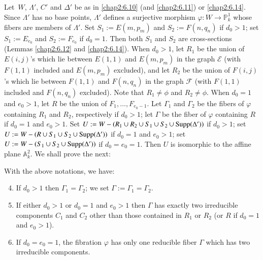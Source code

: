 \subsection{}\label{chap2:6.15}
Let\pageoriginale\ $W$, $\Lambda'$, $C'$ and $\Delta'$ be as in
\ref{chap2:6.10} (and \ref{chap2:6.11}) or \ref{chap2:6.14}. Since $\Lambda'$ has no
base points, $\Lambda'$ defines a surjective morphism $\varphi:W\to
\mathbb{P}^{1}_{k}$ whose fibers are members of $\Lambda'$. Set
$S_{1}:=E(m,p_{m})$ and $S_{2}:=F(n,q_{n})$ if $d_{0}>1$; set
$S_{1}:=E_{e_{0}}$ and $S_{2}:=F_{e_{0}}$ if $d_{0}=1$. Then both
$S_{1}$ and $S_{2}$ are cross-sections (\cf Lemmas \ref{chap2:6.12} and
\ref{chap2:6.14}). When $d_{0}>1$, let $R_{1}$ be the union of $E(i,j)$'s
which lie between $E(1,1)$ and $E(m,p_{m})$ in the graph $\mathscr{E}$
(with $F(1,1)$ included and $E(m,p_{m})$ excluded), and let $R_{2}$ be
the union of $F(i,j)$'s which lie between $F(1,1)$ and $F(n,q_{n})$ in
the graph $\mathscr{F}$ (with $F(1,1)$ included and $F(n,q_{n})$
excluded). Note that $R_{1}\neq \phi$ and $R_{2}\neq \phi$. When
$d_{0}=1$ and $e_{0}>1$, let $R$ be the union of
$F_{1},\ldots,F_{e_{0}-1}$. Let $\Gamma_{1}$ and $\Gamma_{2}$ be the
fibers of $\varphi$ containing $R_{1}$ and $R_{2}$, respectively if
$d_{0}>1$; let $\Gamma$ be the fiber of $\varphi$ containing $R$ if
$d_{0}=1$ and $e_{0}>1$. Set $U:=W-(R_{1}\cup R_{2}\cup S_{1}\cup
S_{2}\cup \operatorname{Supp}(\Delta'))$ if $d_{0}>1$; set $U:=W-(R\cup S_{1}\cup
S_{2}\cup \operatorname{Supp}(\Delta'))$ if $d_{0}=1$ and $e_{0}>1$; set
$U:=W-(S_{1}\cup S_{2}\cup\operatorname{Supp}(\Delta'))$ if $d_{0}=e_{0}=1$. Then
$U$ is isomorphic to the affine plane $\mathbb{A}^{2}_{k}$. We shall
prove the next:

\begin{lemma*}
With the above notations, we have:
\begin{enumerate}
\setcounter{enumi}{3}
\renewcommand{\labelenumi}{\rm(\theenumi)}
\item If $d_{0}>1$ then $\Gamma_{1}=\Gamma_{2}$; we set
  $\Gamma:=\Gamma_{1}=\Gamma_{2}$. 

\item If either $d_{0}>1$ or $d_{0}=1$ and $e_{0}>1$ then $\Gamma$ has
  exactly two irreducible components $C_{1}$ and $C_{2}$ other than
  those contained in $R_{1}$ or $R_{2}$ (or $R$ if $d_{0}=1$ and
  $e_{0}>1$).

\item If $d_{0}=e_{0}=1$, the fibration $\varphi$ has only one
  reducible fiber $\Gamma$ which has two irreducible components.
\end{enumerate}
\end{lemma*}

